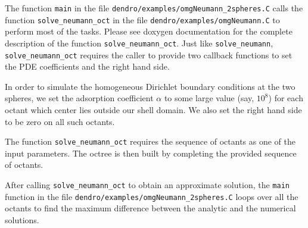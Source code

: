 \documentclass[10pt,reqno,a4paper]{report}
\numberwithin{equation}{section}
\begin{document}
The function \lstinline[basicstyle=\bfseries]'main' in the file \verb'dendro/examples/omgNeumann_2spheres.C' calls the function \lstinline[basicstyle=\bfseries]'solve_neumann_oct' in the file  \verb'dendro/examples/omgNeumann.C' to perform most of the tasks. Please see doxygen documentation for the complete description of the function \lstinline[basicstyle=\bfseries]'solve_neumann_oct'. 
Just like \lstinline[basicstyle=\bfseries]'solve_neumann', \lstinline[basicstyle=\bfseries]'solve_neumann_oct' requires the caller to provide two callback functions to set the  PDE coefficients and the right hand side. 

In order to simulate the homogeneous Dirichlet boundary conditions at the two spheres, we set the adsorption coefficient $\alpha$ to some large value (say, $10^8$) for each octant which center lies outside our shell domain. We also set the right hand side to be zero on all such octants.

The function \lstinline[basicstyle=\bfseries]'solve_neumann_oct' requires the sequence of octants as one of the input parameters. The octree is then built by completing the provided sequence of  octants.

After calling \lstinline[basicstyle=\bfseries]'solve_neumann_oct' to obtain an approximate solution, the \lstinline[basicstyle=\bfseries]'main' function in the file \verb'dendro/examples/omgNeumann_2spheres.C' loops over all the octants to find the maximum difference between the analytic and the numerical solutions.
\end{document}
